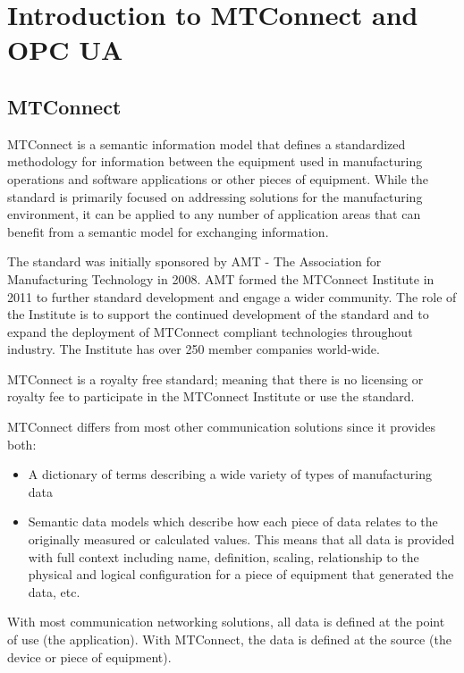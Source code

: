 \section{Introduction to MTConnect and OPC UA}\label{intro}

\subsection{MTConnect}\label{intro-to-mtconnect}

MTConnect is a semantic information model that defines a standardized methodology for information between the equipment used in manufacturing operations and software applications or other pieces of equipment. While the standard is primarily focused on addressing solutions for the manufacturing environment, it can be applied to any number of application areas that can benefit from a semantic model for exchanging information. 
   
The standard was initially sponsored by AMT - The Association for Manufacturing Technology in 2008.  AMT formed the MTConnect Institute in 2011 to further standard development and engage a wider community. The role of the Institute is to support the continued development of the standard and to expand the deployment of MTConnect compliant technologies throughout industry. The Institute has over 250 member companies world-wide.  

MTConnect is a royalty free standard; meaning that there is no licensing or royalty fee to participate in the MTConnect Institute or use the standard.

MTConnect differs from most other communication solutions since it provides both:
\begin{itemize}
    \item A dictionary of terms describing a wide variety of types of manufacturing data
    \item Semantic data models which describe how each piece of data relates to the originally measured or calculated values. This means that all data is provided with full context including name, definition, scaling, relationship to the physical and logical configuration for a piece of equipment that generated the data, etc.
\end{itemize}

With most communication networking solutions, all data is defined at the point of use (the application).  With MTConnect, the data is defined at the source (the device or piece of equipment). 

